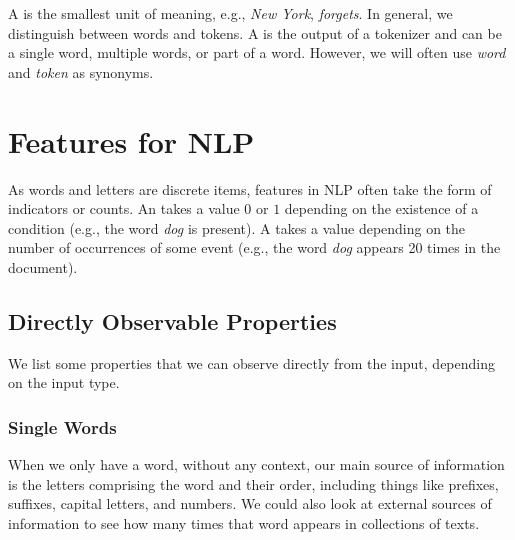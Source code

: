 \begin{definition}{}
    A  is the smallest unit of meaning, e.g., \textit{New York}, \textit{forgets}. In general, we distinguish between words and tokens. A  is the output of a tokenizer and can be a single word, multiple words, or part of a word. However, we will often use \textit{word} and \textit{token} as synonyms.
\end{definition}

\section{Features for NLP}
As words and letters are discrete items, features in NLP often take the form of indicators or counts. An  takes a value $0$ or $1$ depending on the existence of a condition (e.g., the word \textit{dog} is present). A  takes a value depending on the number of occurrences of some event (e.g., the word \textit{dog} appears 20 times in the document).

\subsection{Directly Observable Properties}
We list some properties that we can observe directly from the input, depending on the input type.

\subsubsection{Single Words}
When we only have a word, without any context, our main source of information is the letters comprising the word and their order, including things like prefixes, suffixes, capital letters, and numbers. We could also look at external sources of information to see how many times that word appears in collections of texts.

